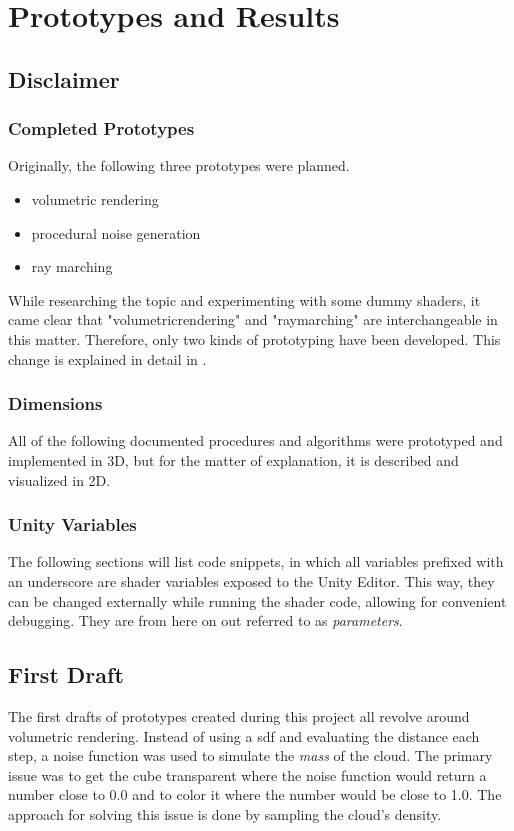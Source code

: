 \section{Prototypes and Results}

\subsection{Disclaimer}
\subsubsection{Completed Prototypes}
Originally, the following three prototypes were planned.
\begin{itemize}
    \item volumetric rendering
    \item procedural noise generation
    \item ray marching
\end{itemize}
While researching the topic and experimenting with some dummy shaders, it came clear that "\gls{volumetricrendering}" and "\gls{raymarching}" are interchangeable in this matter.
Therefore, only two kinds of prototyping have been developed. This change is explained in detail in .

\subsubsection{Dimensions}
All of the following documented procedures and algorithms were prototyped and implemented in 3D, but for the matter of explanation, it is described and visualized in 2D.

\subsubsection{Unity Variables}
The following sections will list code snippets, in which all variables prefixed with an underscore are shader variables exposed to the Unity Editor. This way, they can be changed externally while running the shader code, allowing for convenient debugging.
They are from here on out referred to as \textit{\gls{parameters}}.

\clearpage
\subsection{First Draft}
The first drafts of prototypes created during this project all revolve around volumetric rendering. 
Instead of using a \gls{sdf} and evaluating the distance each step, a noise function was used to simulate the \textit{mass} of the cloud. 
The primary issue was to get the cube transparent where the noise function would return a number close to 0.0 and to color it where the number would be close to 1.0.
The approach for solving this issue is done by sampling the cloud's density.

